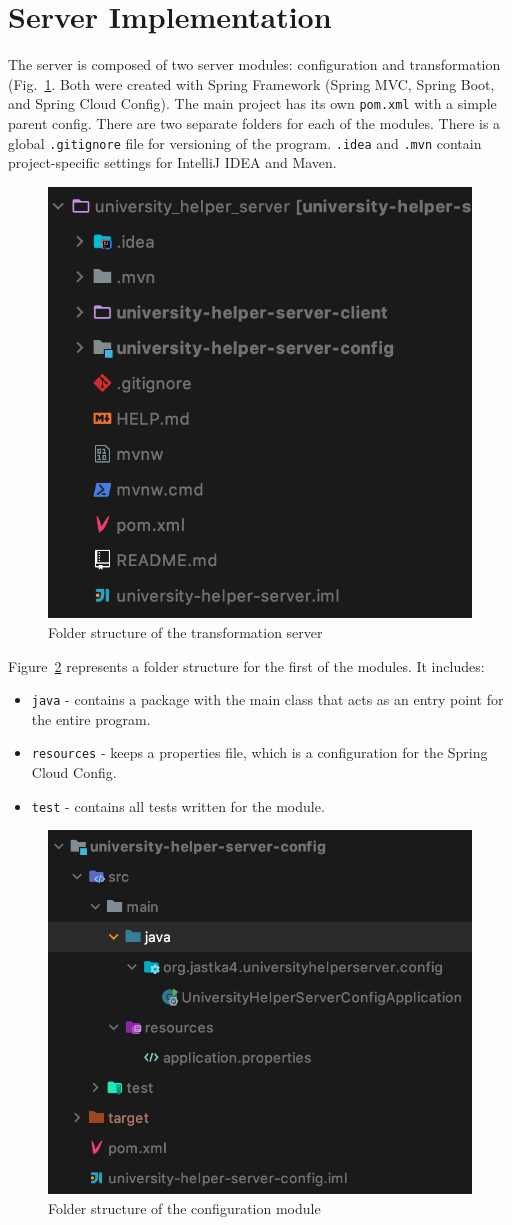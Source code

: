 

\section{Server Implementation}
The server is composed of two server modules: configuration and transformation (Fig.~\ref{fig:server-folder-structure}. Both were created with Spring Framework (Spring MVC, Spring Boot, and Spring Cloud Config). The main project has its own \texttt{pom.xml} with a simple parent config. There are two separate folders for each of the modules. There is a global \texttt{.gitignore} file for versioning of the program. \texttt{.idea} and \texttt{.mvn} contain project-specific settings for IntelliJ IDEA and Maven.

\begin{figure}[htb]
    \centering
    \includegraphics[width=.4\linewidth]{fig04/server-folder-structure.png}
    \caption{Folder structure of the transformation server}
    \label{fig:server-folder-structure}
\end{figure}

Figure~\ref{fig:server-config-folder-structure} represents a folder structure for the first of the modules. It includes:
\begin{itemize}
    \item \texttt{java} - contains a package with the main class that acts as an entry point for the entire program.
    \item \texttt{resources} - keeps a properties file, which is a configuration for the Spring Cloud Config.
    \item \texttt{test} - contains all tests written for the module.
\end{itemize}

\begin{figure}[htb]
    \centering
    \includegraphics[width=.4\linewidth]{fig04/server-config-folder-structure.png}
    \caption{Folder structure of the configuration module}
    \label{fig:server-config-folder-structure}
\end{figure}

